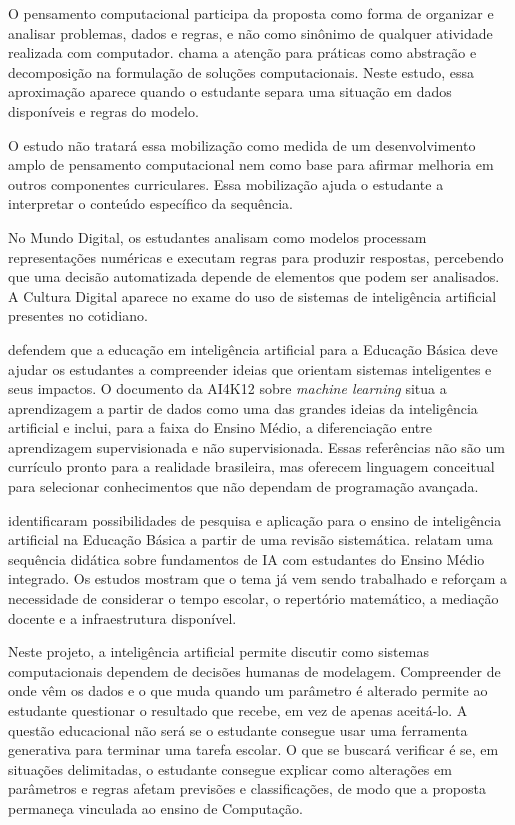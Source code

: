 O pensamento computacional participa da proposta como forma de organizar e analisar problemas, dados e regras, e não como sinônimo de qualquer atividade realizada com computador.  chama a atenção para práticas como abstração e decomposição na formulação de soluções computacionais. Neste estudo, essa aproximação aparece quando o estudante separa uma situação em dados disponíveis e regras do modelo.

O estudo não tratará essa mobilização como medida de um desenvolvimento amplo de pensamento computacional nem como base para afirmar melhoria em outros componentes curriculares. Essa mobilização ajuda o estudante a interpretar o conteúdo específico da sequência.

No Mundo Digital, os estudantes analisam como modelos processam representações numéricas e executam regras para produzir respostas, percebendo que uma decisão automatizada depende de elementos que podem ser analisados. A Cultura Digital aparece no exame do uso de sistemas de inteligência artificial presentes no cotidiano.

 defendem que a educação em inteligência artificial para a Educação Básica deve ajudar os estudantes a compreender ideias que orientam sistemas inteligentes e seus impactos. O documento da AI4K12 sobre \textit{machine learning} \cite{touretzky2023machine} situa a aprendizagem a partir de dados como uma das grandes ideias da inteligência artificial e inclui, para a faixa do Ensino Médio, a diferenciação entre aprendizagem supervisionada e não supervisionada. Essas referências não são um currículo pronto para a realidade brasileira, mas oferecem linguagem conceitual para selecionar conhecimentos que não dependam de programação avançada.

 identificaram possibilidades de pesquisa e aplicação para o ensino de inteligência artificial na Educação Básica a partir de uma revisão sistemática.  relatam uma sequência didática sobre fundamentos de IA com estudantes do Ensino Médio integrado. Os estudos mostram que o tema já vem sendo trabalhado e reforçam a necessidade de considerar o tempo escolar, o repertório matemático, a mediação docente e a infraestrutura disponível.

Neste projeto, a inteligência artificial permite discutir como sistemas computacionais dependem de decisões humanas de modelagem. Compreender de onde vêm os dados e o que muda quando um parâmetro é alterado permite ao estudante questionar o resultado que recebe, em vez de apenas aceitá-lo. A questão educacional não será se o estudante consegue usar uma ferramenta generativa para terminar uma tarefa escolar. O que se buscará verificar é se, em situações delimitadas, o estudante consegue explicar como alterações em parâmetros e regras afetam previsões e classificações, de modo que a proposta permaneça vinculada ao ensino de Computação.

